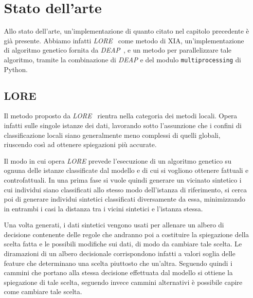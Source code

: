 \chapter{Stato dell'arte}



Allo stato dell'arte, un'implementazione di quanto citato nel capitolo
precedente è già presente. Abbiamo infatti \textit{LORE}~\cite{guidotti2018LORE}
come metodo di XIA, un'implementazione di algoritmo genetico fornita da
\textit{DEAP}~\cite{fortin2012DEAP}, e un metodo per parallelizzare tale
algoritmo, tramite la combinazione di \textit{DEAP} e del modulo
\verb|multiprocessing| di Python.

\section{LORE}

Il metodo proposto da \textit{LORE}~\cite{guidotti2018LORE} rientra nella
categoria dei metodi locali. Opera infatti sulle singole istanze dei dati,
lavorando sotto l'assunzione che i confini di classificazione locali siano
generalmente meno complessi di quelli globali, riuscendo così ad ottenere %
spiegazioni più accurate.

Il modo in cui opera \textit{LORE} prevede l'esecuzione di un algoritmo genetico
su ognuna delle istanze classificate dal modello e di cui si vogliono ottenere
fattuali e controfattuali. In una prima fase si vuole quindi generare un
vicinato sintetico i cui individui siano classificati allo stesso modo
dell'istanza di riferimento, si cerca poi di generare individui sintetici
classificati diversamente da essa, minimizzando in entrambi i casi la distanza
tra i vicini sintetici e l'istanza stessa.

Una volta generati, i dati sintetici vengono usati per allenare un albero di
decisione contenente delle regole che andranno poi a costituire la spiegazione
della scelta fatta e le possibili modifiche sui dati, di modo da cambiare tale
scelta. Le diramazioni di un albero decisionale corrispondono infatti a valori
soglia delle feature che determinano una scelta piuttosto che un'altra. Seguendo
quindi i cammini che portano alla stessa decisione effettuata dal modello si
ottiene la spiegazione di tale scelta, seguendo invece cammini alternativi è
possibile capire come cambiare tale scelta.

